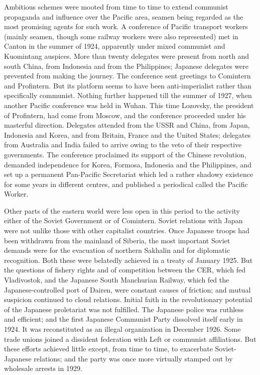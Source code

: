 Ambitious schemes were mooted from time to time to extend communist propaganda and influence over the Pacific area, seamen being regarded as the most promising agents for such work. A conference of Pacific transport workers (mainly seamen, though some railway workers were also represented) met in Canton in the summer of 1924, apparently under mixed communist and Kuomintang auspices. More than twenty delegates were present from north and south China, from Indonesia and from the Philippines; Japanese delegates were prevented from making the journey. The conference sent greetings to Comintern and Profintern. But its platform seems to have been anti-imperialist rather than specifically communist. Nothing further happened till the summer of 1927, when another Pacific conference was held in Wuhan. This time Lozovsky, the president of Profintern, had come from Moscow, and the conference proceeded under his masterful direction. Delegates attended from the USSR and China, from Japan, Indonesia and Korea, and from Britain, France and the United States; delegates from Australia and India failed to arrive owing to the veto of their respective governments. The conference proclaimed its support of the Chinese revolution, demanded independence for Korea, Formosa, Indonesia and the Philippines, and set up a permanent Pan-Pacific Secretariat which led a rather shadowy existence for some years in different centres, and published a periodical called the Pacific Worker. 

Other parts of the eastern world were less open in this period to the activity either of the Soviet Government or of Comintern. Soviet relations with Japan were not unlike those with other capitalist countries. Once Japanese troops had been withdrawn from the mainland of Siberia, the most important Soviet demands were for the evacuation of northern Sakhalin and for diplomatic recognition. Both these were belatedly achieved in a treaty of January 1925. But the questions of fishery rights and of competition between the CER, which fed Vladivostok, and the Japanese South Manchurian Railway, which fed the Japanese-controlled port of Dairen, were constant causes of friction; and mutual suspicion continued to cloud relations. Initial faith in the revolutionary potential of the Japanese proletariat was not fulfilled. The Japanese police was ruthless and efficient; and the first Japanese Communist Party dissolved itself early in 1924. It was reconstituted as an illegal organization in December 1926. Some trade unions joined a dissident federation with Left or communist affiliations. But these efforts achieved little except, from time to time, to exacerbate Soviet-Japanese relations; and the party was once more virtually stamped out by wholesale arrests in 1929. 

